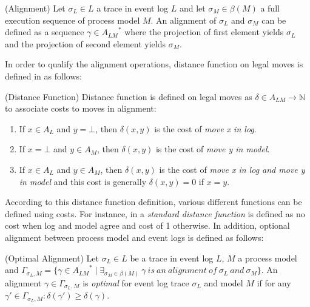 \theoremstyle{definition}
\begin{definition}{}
(Alignment) Let $\sigma_{L} \in L$ a trace in event log $L$ and let $\sigma_{M} \in \beta (M)$ a full execution sequence of process model $M$. An alignment of $\sigma_{L}$ and $\sigma_{M}$ can be defined as a sequence $\gamma \in {A_{LM}}^{*}$  where the projection of first element yields $\sigma_{L}$ and the projection of second element yields $\sigma_{M}$. 
\end{definition}

In order to qualify the alignment operations, distance function on legal moves is defined in \cite{van2012replaying} as follows:
\theoremstyle{definition}
\begin{definition}{}
(Distance Function) Distance function is defined on legal moves as $\delta \in A_{LM} \rightarrow \mathbb{N}$ to associate costs to moves in alignment:
\begin{enumerate}
  \item If $x \in A_{L}$ and $y=\bot$, then  $\delta(x,y)$ is the cost of \textit{move x in log}.
  \item If $x=\bot$ and $y \in A_{M}$, then  $\delta(x,y)$ is the cost of \textit{move y in model}.
  \item If $x \in A_{L}$ and $y \in A_{M}$, then  $\delta(x,y)$ is the cost of \textit{move x in log and move y in model} and this cost is generally $\delta(x,y) = 0$ if $x = y$.
\end{enumerate}
\end{definition}

According to this distance function definition, various different functions can be defined using costs. For instance, in \cite{van2012replaying} a \textit{standard distance function} is defined as no cost when log and model agree and cost of 1 otherwise. In addition, optional alignment between process model and event logs is defined as follows:
 
\begin{definition}{}
(Optimal Alignment) Let $\sigma_{L} \in L$ be a trace in event log $L$, $M$ a process model and $\Gamma_{\sigma_{L},M} = \{ \gamma \in {A_{LM}}^{*} \mid \exists_{\sigma_{M} \in \beta (M)}\ \gamma\ is\ an\ alignment\ of\ \sigma_{L}\ and\ \sigma_{M} \}$. An alignment $\gamma \in \Gamma_{\sigma_{L},M}$ is \textit{optimal} for event log trace $\sigma_{L}$ and model $M$ if for any ${\gamma}' \in \Gamma_{\sigma_{L},M} : \delta({\gamma}')\geq \delta(\gamma)$.
\end{definition}


